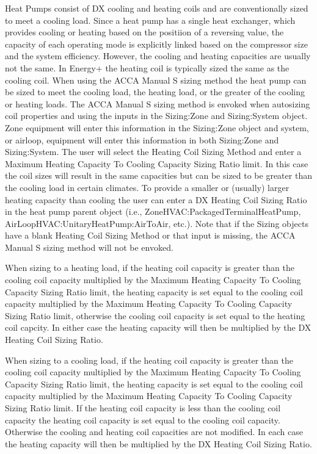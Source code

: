 Heat Pumps consist of DX cooling and heating coils and are conventionally sized to meet a cooling load. Since a heat pump has a single heat exchanger, which provides cooling or heating based on the positiion of a reversing value, the capacity of each operating mode is explicitly linked based on the compressor size and the system efficiency. However, the cooling and heating capacities are usually not the same. In Energy+ the heating coil is typically sized the same as the cooling coil. When using the ACCA Manual S sizing method the heat pump can be sized to meet the cooling load, the heating load, or the greater of the cooling or heating loads. The ACCA Manual S sizing method is envoked when autosizing coil properties and using the inputs in the Sizing:Zone and Sizing:System object. Zone equipment will enter this information in the Sizing:Zone object and system, or airloop, equipment will enter this information in both Sizing:Zone and Sizing:System. The user will select the Heating Coil Sizing Method and enter a Maximum Heating Capacity To Cooling Capacity Sizing Ratio limit. In this case the coil sizes will result in the same capacities but can be sized to be greater than the cooling load in certain climates. To provide a smaller or (usually) larger heating capacity than cooling the user can enter a DX Heating Coil Sizing Ratio in the heat pump parent object (i.e., ZoneHVAC:PackagedTerminalHeatPump, AirLoopHVAC:UnitaryHeatPump:AirToAir, etc.). Note that if the Sizing objects have a blank Heating Coil Sizing Method or that input is missing, the ACCA Manual S sizing method will not be envoked.

When sizing to a heating load, if the heating coil capacity is greater than the cooling coil capacity multiplied by the Maximum Heating Capacity To Cooling Capacity Sizing Ratio limit, the heating capacity is set equal to the cooling coil capacity multiplied by the Maximum Heating Capacity To Cooling Capacity Sizing Ratio limit, otherwise the cooling coil capacity is set equal to the heating coil capcity. In either case the heating capacity will then be multiplied by the DX Heating Coil Sizing Ratio.

When sizing to a cooling load, if the heating coil capacity is greater than the cooling coil capacity multiplied by the Maximum Heating Capacity To Cooling Capacity Sizing Ratio limit, the heating capacity is set equal to the cooling coil capacity multiplied by the Maximum Heating Capacity To Cooling Capacity Sizing Ratio limit. If the heating coil capacity is less than the cooling coil capacity the heating coil capacity is set equal to the cooling coil capacity. Otherwise the cooling and heating coil capacities are not modified. In each case the heating capacity will then be multiplied by the DX Heating Coil Sizing Ratio.

